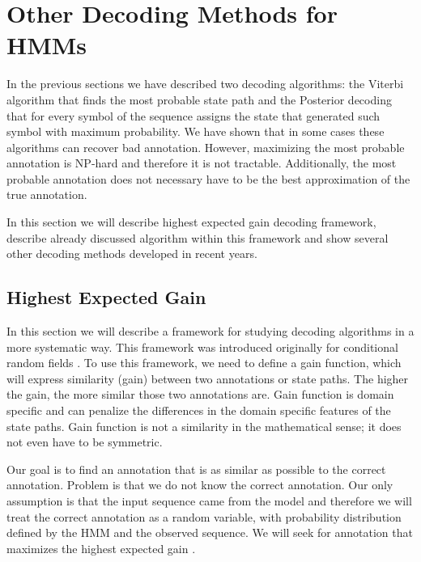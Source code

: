 \section{Other Decoding Methods for HMMs}
In the previous sections we have described two decoding algorithms: the Viterbi algorithm
that finds the most probable state path  and the Posterior decoding that for
every symbol of the sequence assigns the state that generated such symbol with
maximum probability. 
We have shown that in some cases these algorithms can recover bad
annotation. However, maximizing the most probable annotation is NP-hard and
therefore it is not tractable. Additionally, the most probable annotation does
not necessary have to be the best approximation of the true annotation.

In this section we will describe highest expected gain decoding framework,
describe already discussed algorithm within this framework and show several
other decoding methods developed in recent years.

\subsection{Highest Expected Gain}

\label{SECTION:HEG}

In this section we will describe a framework for studying decoding algorithms in
a more systematic way. This framework was introduced  originally for
conditional random fields \cite{Gross2007}.  To use this framework, we need to
define a gain function, which will express similarity (gain) between two
annotations or state paths. The higher the gain, the more similar those two
annotations are. Gain function is domain specific and can penalize the differences
in the domain specific features of the state paths.  Gain function is not a
similarity in the mathematical sense; it does not even have to be symmetric.

Our goal is to find an annotation that is as similar as possible to the correct
annotation. Problem is that we do not know the correct annotation. Our only
assumption is that the input sequence came from the model and therefore we will
treat the correct annotation as a random variable, with probability distribution
defined by the HMM and the observed sequence. We will seek for annotation that
maximizes the highest expected gain \cite{Nanasi2010,Nanasi2010mgr}.

